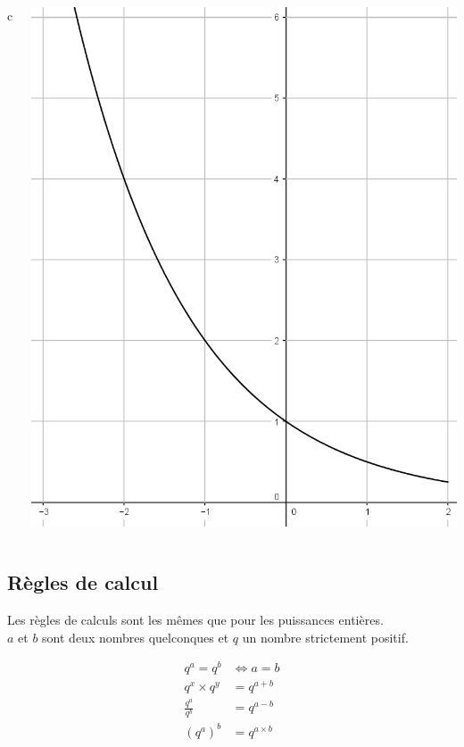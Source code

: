\documentclass[xcolor={dvipsnames}]{beamer}
\begin{document}
\begin{frame}
\begin{myex}
\begin{columns}{c}
\begin{column}{6cm}
			\begin{center}
				\includegraphics[scale=0.2]{var2}
			\end{center}
			
		\end{column}
		
	\end{columns}
\end{myex}

\end{frame}

\subsection{Règles de calcul}

\begin{frame}
	\begin{myprops}
		Les règles de calculs sont les mêmes que pour les puissances entières.\\
		$a$ et $b$ sont deux nombres quelconques et $q$ un nombre strictement positif.
		
		\begin{align*}
		q^a = q^b &\Leftrightarrow a = b\\
		q^x \times q^y &= q^{a+b}\\
		\frac{q^a}{q^b} &= q^{a-b}\\
		(q^a)^b &= q^{a \times b}
		\end{align*}
		\end{myprops}
			
\end{frame}
\end{document}
